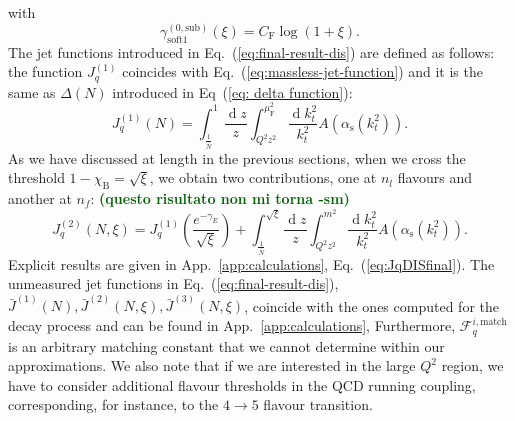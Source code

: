 \documentclass[letterpaper,11pt]{article}
\newcommand{\as}{\alpha_\text{s}}
\newcommand{\cf}{C_{\text{F}}}
\DeclareMathOperator{\De}{d}
\newcommand{\de}{\De\!}
\newcommand{\gszerotildeMm}{\gamma_\text{soft1}^{(0,\text{sub})}}
\newcommand{\muf}{\mu_{\text{F}}}
\newcommand{\sm}[1]{\textbf{\textcolor{darkgreen}{(#1 -sm)}}}
\begin{document}
with
\begin{equation}
\gszerotildeMm(\xi)=\cf\log{\left(1+\xi\right)}.
\end{equation}
The jet functions introduced in Eq.~(\ref{eq:final-result-dis}) are defined as follows:
the function $J^{(1)}_q$ coincides with Eq.~(\ref{eq:massless-jet-function}) and it is the same as $\Delta(N)$ introduced in Eq~(\ref{eq: delta function}):
\begin{equation}
	J^{(1)}_q(N)=\int^{1}_{{\frac{1}{ \bar N}}} \frac{\de z}{z} \int^{\muf^2}_{Q^2 z^2} \frac{\de k_t^2}{k_t^2} A\left(\as(k_t^2)\right).
\end{equation}
As we have discussed at length in the previous sections, when we cross the threshold $1-\chi_{\text{B}}=\sqrt{\xi}$, we obtain two contributions, one at $n_l$ flavours and another at $n_f$: \sm{questo risultato non mi torna}
\begin{equation}\label{eq: J2}
 		J^{(2)}_q(N,\xi)=J^{(1)}_q\left(\frac{e^{-\gamma_E}}{\sqrt{\xi}} \right)+ \int^{\sqrt{\xi}}_{\frac{1}{\bar N}} \frac{\de z}{z} \int^{m^2}_{Q^2 z^2} \frac{\de k_t^2}{k_t^2}  A\left(\as(k_t^2)\right).
 \end{equation}
Explicit results are given in App.~\ref{app:calculations}, Eq.~(\ref{eq:JqDISfinal}).
The unmeasured jet functions in Eq.~(\ref{eq:final-result-dis}), $\bar{J}^{(1)}(N),\bar{J}^{(2)}(N,\xi),\bar{J}^{(3)}(N,\xi)$, coincide with the ones computed for the decay process and can be found in App.~\ref{app:calculations},
Furthermore, $\mathcal{F}_q^{i,\text{match}}$ is an arbitrary matching constant that we cannot determine within our approximations. 
We also note that if we are interested in the large $Q^2$ region, we have to consider additional flavour thresholds in the QCD running coupling, corresponding, for instance, to the $4 \to 5$ flavour transition.
%
\end{document}
